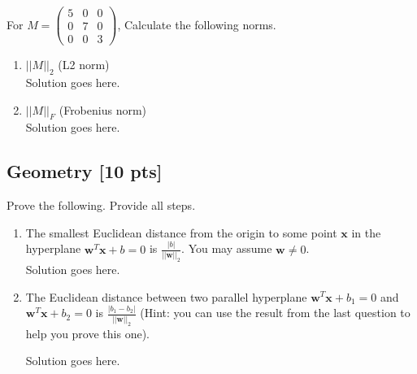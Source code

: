 \documentclass[a4paper]{article}
\theoremstyle{definition}
\newenvironment{soln}{
	\leavevmode\color{blue}\ignorespaces
}{}
\begin{document}
	For $M = \begin{pmatrix}
		5 & 0 & 0 \\ 0 & 7 & 0 \\ 0 & 0 & 3
		
	\end{pmatrix}$, Calculate the following norms.
	\begin{enumerate}\addtocounter{enumi}{3}
		\item $||M||_{2}$ (L2 norm) \\
		\begin{soln}  Solution goes here. \end{soln}
		
		\item $||M||_{F}$ (Frobenius norm)\\
		\begin{soln}  Solution goes here. \end{soln}
		
		
	\end{enumerate}
	
	
	
	\subsection{Geometry [10 pts]}
	Prove the following.  Provide all steps.
	\begin{enumerate}
		\item 	The smallest Euclidean distance from the origin to some point $\mathbf{x}$ in the hyperplane $\mathbf{w}^{T}\mathbf{x} + b = 0$ is $\frac{|b|}{||\mathbf{w}||_2}$.  You may assume $\mathbf{w} \neq 0$.\\
		\begin{soln}  Solution goes here. \end{soln}
		
		\item 	The Euclidean distance between two parallel hyperplane $\mathbf{w}^{T}\mathbf{x} + b_1 = 0$ and $\mathbf{w}^{T}\mathbf{x} + b_2 = 0$ is $\frac{|b_1 - b_2|}{||\mathbf{w}||_2}$ (Hint: you can use the result from the last question to help you prove this one).
		
		\begin{soln}  Solution goes here. \end{soln}
		
	\end{enumerate}
	
	
	
\end{document}
